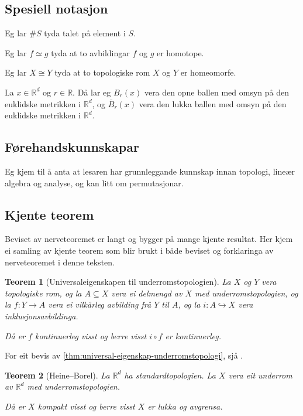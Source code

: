 \documentclass[a4paper, 12pt, norsk]{article}
\theoremstyle{plain}
\newtheorem{theorem}{Teorem}[section]
\theoremstyle{definition}
\newcommand{\Rb}{\mathbb{R}}
\begin{document}
\subsection{Spesiell notasjon}
 
Eg lar \( \#S \) tyda talet på element i \( S \).

Eg lar \( f \simeq  g \) tyda at to avbildingar \( f \) og \( g \) er homotope.

Eg lar \( X \cong Y \) tyda at to topologiske rom \( X \) og \( Y \) er homeomorfe.

La \( x \in \Rb^d \) og \( r \in \Rb \). Då lar eg \( B_r(x) \) vera den opne ballen med omsyn på den euklidske metrikken i \( \Rb^d \), og \( \bar{B}_r(x) \) vera den lukka ballen med omsyn på den euklidske metrikken i \( \Rb^d \).

\subsection{Førehandskunnskapar}

Eg kjem til å anta at lesaren har grunnleggande kunnskap innan topologi, lineær algebra og analyse, og kan litt om permutasjonar.

\subsection{Kjente teorem}

Beviset av nerveteoremet er langt og bygger på mange kjente resultat. Her kjem ei samling av kjente teorem som blir brukt i både beviset og forklaringa av nerveteoremet i denne teksten.

\begin{theorem}[Universaleigenskapen til underromstopologien] \label{thm:universal-eigenskap-underromstopologi}
	La \( X \) og \( Y \) vera topologiske rom, og la \( A \subseteq X \) vera ei delmengd av \( X \) med underromstopologien, og la \( f: Y \to A \) vera ei vilkårleg avbilding frå \( Y \) til \( A \), og la \( i: A \hookrightarrow X \) vera inklusjonsavbildinga. 
	
	Då er \( f \) kontinuerleg visst og berre visst \( i \circ f \) er kontinuerleg.
\end{theorem}

For eit bevis av \autoref{thm:universal-eigenskap-underromstopologi}, sjå \cite[s. 98]{MR2548039}.

\begin{theorem}[Heine--Borel] \label{thm:heine-borel} 
	La \( \Rb^d \) ha standardtopologien. La \( X \) vera eit underrom av \( \Rb^d \) med underromstopologien.
	
	Då er \( X \) kompakt visst og berre visst \( X \) er lukka og avgrensa.
\end{theorem}
\end{document}
